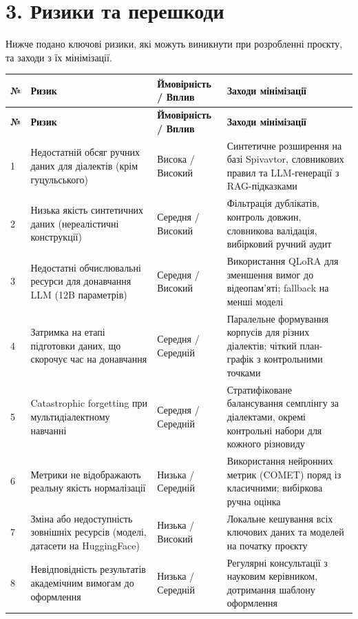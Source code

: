 \documentclass[14pt]{extarticle}
\begin{document}
\section*{3. Ризики та перешкоди}

Нижче подано ключові ризики, які можуть виникнути при розробленні проєкту, та заходи з їх мінімізації.

\begin{longtable}{|p{}|p{}|p{}|p{}|}
\hline
\textbf{№} & \textbf{Ризик} & \textbf{Ймовірність / Вплив} & \textbf{Заходи мінімізації} \\
\hline
\endfirsthead
\hline
\textbf{№} & \textbf{Ризик} & \textbf{Ймовірність / Вплив} & \textbf{Заходи мінімізації} \\
\hline
\endhead
1 & Недостатній обсяг ручних даних для діалектів (крім гуцульського) & Висока / Високий & Синтетичне розширення на базі Spivavtor, словникових правил та LLM-генерації з RAG-підказками \\
\hline
2 & Низька якість синтетичних даних (нереалістичні конструкції) & Середня / Високий & Фільтрація дублікатів, контроль довжин, словникова валідація, вибірковий ручний аудит \\
\hline
3 & Недостатні обчислювальні ресурси для донавчання LLM (12B параметрів) & Середня / Високий & Використання QLoRA для зменшення вимог до відеопам'яті; fallback на менші моделі \\
\hline
4 & Затримка на етапі підготовки даних, що скорочує час на донавчання & Середня / Середній & Паралельне формування корпусів для різних діалектів; чіткий план-графік з контрольними точками \\
\hline
5 & Catastrophic forgetting при мультидіалектному навчанні & Середня / Середній & Стратифіковане балансування семплінгу за діалектами, окремі контрольні набори для кожного різновиду \\
\hline
6 & Метрики не відображають реальну якість нормалізації & Низька / Середній & Використання нейронних метрик (COMET) поряд із класичними; вибіркова ручна оцінка \\
\hline
7 & Зміна або недоступність зовнішніх ресурсів (моделі, датасети на HuggingFace) & Низька / Високий & Локальне кешування всіх ключових даних та моделей на початку проєкту \\
\hline
8 & Невідповідність результатів академічним вимогам до оформлення & Низька / Середній & Регулярні консультації з науковим керівником, дотримання шаблону оформлення \\
\hline
\end{longtable}
\end{document}
